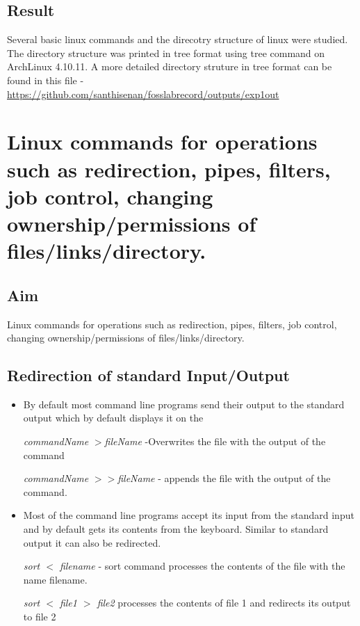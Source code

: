 \documentclass{article}
\begin{document}
\subsection{Result}
Several basic linux commands and the direcotry structure of linux were studied. The directory structure was printed in tree format using tree command on ArchLinux 4.10.11. A more detailed directory struture in tree format can be found in this file - \url{https://github.com/santhisenan/fosslabrecord/outputs/exp1out}
\begin{refsection}
\cite{commands}
\cite{directorystructure}
\printbibliography
\end{refsection}
\newpage
\section{Linux commands for operations such as redirection, pipes, filters, job control, changing ownership/permissions of files/links/directory.}

\subsection{Aim}
Linux commands for operations such as redirection, pipes, filters, job control, changing ownership/permissions of files/links/directory.

\subsection{Redirection of standard Input/Output}
\begin{itemize}
\item By default most command line programs send their output to the standard output which by default displays it on the 

\hspace{10mm} \textit{commandName} $>$\textit{fileName} -Overwrites the file with the output of the command

\hspace{10mm} \textit{commandName} $>>$\textit{fileName} - appends the file with the output of the command.

\item Most of the command line programs accept its input from the standard input and by default gets its contents from the keyboard. Similar to standard output it can also be redirected.

\textit{sort $<$ filename} - sort command processes the contents of the file with the name filename.

\hspace{10mm} \textit{sort $<$ file1 $>$ file2} processes the contents of file 1 and redirects its output to file 2

\end{itemize}
\end{document}
